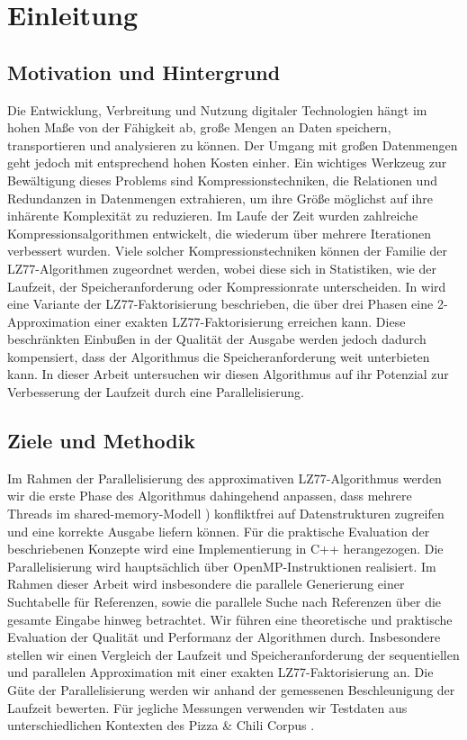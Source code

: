 \chapter{Einleitung}
\section{Motivation und Hintergrund}
Die Entwicklung, Verbreitung und Nutzung digitaler Technologien hängt im hohen Maße von der Fähigkeit ab, große Mengen an Daten speichern, transportieren und
analysieren zu können. Der Umgang mit großen Datenmengen geht jedoch mit entsprechend hohen Kosten einher. Ein wichtiges Werkzeug zur Bewältigung dieses Problems
sind Kompressionstechniken, die Relationen und Redundanzen in Datenmengen extrahieren, um ihre Größe möglichst auf ihre inhärente Komplexität zu reduzieren. 
Im Laufe der Zeit wurden zahlreiche Kompressionsalgorithmen entwickelt, die wiederum über mehrere Iterationen verbessert wurden. Viele solcher Kompressionstechniken
können der Familie der LZ77-Algorithmen \cite{LemZiv} zugeordnet werden, wobei diese sich in Statistiken, wie der Laufzeit, der Speicheranforderung oder Kompressionrate 
unterscheiden. In \cite{ApproxLZ77} wird eine Variante der LZ77-Faktorisierung beschrieben, die über drei Phasen eine 2-Approximation einer exakten LZ77-Faktorisierung
 \cite{exactLemZiv} erreichen kann. Diese beschränkten Einbußen in der Qualität der Ausgabe werden jedoch dadurch kompensiert, dass der Algorithmus die Speicheranforderung
weit unterbieten kann. In dieser Arbeit untersuchen wir diesen Algorithmus auf ihr Potenzial zur Verbesserung der Laufzeit durch eine Parallelisierung.

\section{Ziele und Methodik}
Im Rahmen der Parallelisierung des approximativen LZ77-Algorithmus werden wir die erste Phase des Algorithmus dahingehend anpassen, dass mehrere Threads im 
shared-memory-Modell \cite{jaja}) konfliktfrei auf Datenstrukturen zugreifen und eine korrekte Ausgabe liefern können. Für die praktische Evaluation der
beschriebenen Konzepte wird eine Implementierung in C++ herangezogen. Die Parallelisierung wird hauptsächlich über OpenMP-Instruktionen \cite{openmp} realisiert.
Im Rahmen dieser Arbeit wird insbesondere die parallele Generierung einer Suchtabelle für Referenzen, sowie die parallele Suche nach Referenzen über die gesamte Eingabe
hinweg betrachtet. Wir führen eine theoretische und praktische Evaluation der Qualität und Performanz der Algorithmen durch. Insbesondere stellen wir einen Vergleich der
Laufzeit und Speicheranforderung der sequentiellen und parallelen Approximation mit einer exakten LZ77-Faktorisierung \cite{exactLemZiv} an. Die Güte der Parallelisierung
werden wir anhand der gemessenen Beschleunigung der Laufzeit bewerten. Für jegliche Messungen verwenden wir Testdaten aus unterschiedlichen Kontexten des 
Pizza \& Chili Corpus \cite{corpus}.